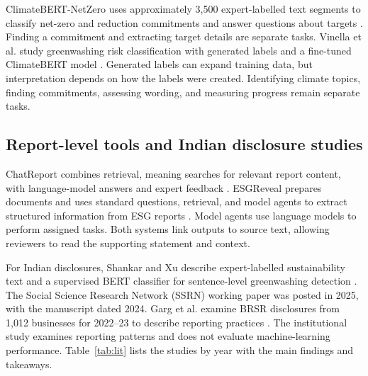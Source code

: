 \begin{lrbox}{\literaturereviewpagebox}
\begin{minipage}{\linewidth}
ClimateBERT-NetZero uses approximately 3,500 expert-labelled text segments to classify net-zero and reduction commitments and answer questions about targets \cite{schimanski2023}. Finding a commitment and extracting target details are separate tasks. Vinella et al. study greenwashing risk classification with generated labels and a fine-tuned ClimateBERT model \cite{vinella2024}. Generated labels can expand training data, but interpretation depends on how the labels were created. Identifying climate topics, finding commitments, assessing wording, and measuring progress remain separate tasks.

\subsection{Report-level tools and Indian disclosure studies}

ChatReport combines retrieval, meaning searches for relevant report content, with language-model answers and expert feedback \cite{ni2023}. ESGReveal prepares documents and uses standard questions, retrieval, and model agents to extract structured information from ESG reports \cite{zou2025}. Model agents use language models to perform assigned tasks. Both systems link outputs to source text, allowing reviewers to read the supporting statement and context.

For Indian disclosures, Shankar and Xu describe expert-labelled sustainability text and a supervised BERT classifier for sentence-level greenwashing detection \cite{shankar2025}. The Social Science Research Network (SSRN) working paper was posted in 2025, with the manuscript dated 2024. Garg et al. examine BRSR disclosures from 1,012 businesses for 2022--23 to describe reporting practices \cite{garg2025}. The institutional study examines reporting patterns and does not evaluate machine-learning performance. Table~\ref{tab:lit} lists the studies by year with the main findings and takeaways.
\end{minipage}
\end{lrbox}
\ifdim\dimexpr\ht\literaturereviewpagebox+\dp\literaturereviewpagebox\relax>\textheight
  \PackageError{GRASP-layout}{Literature subsections 2.1--2.3 exceed one page}{Shorten repeated wording while retaining the studies and citations.}
\fi
\noindent\usebox{\literaturereviewpagebox}\par

